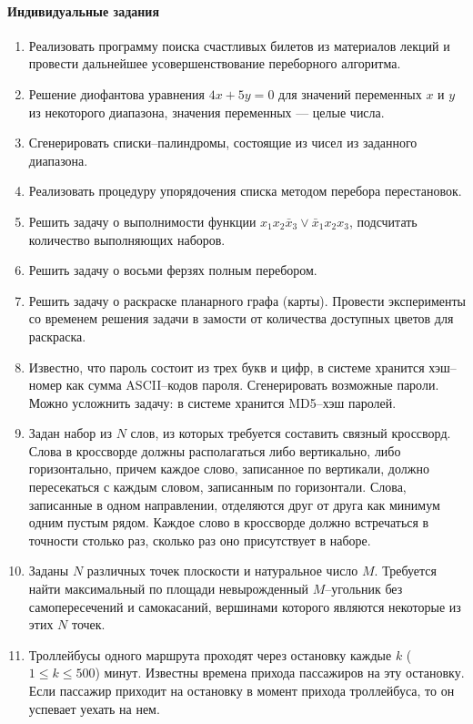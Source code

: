 \documentclass[12pt, openany, twoside]{book} %
\begin{document}
\paragraph{Индивидуальные задания}
\begin{enumerate}
\item Реализовать программу поиска счастливых билетов из материалов лекций и провести дальнейшее усовершенствование переборного алгоритма.
\item Решение диофантова уравнения $4x+5y=0$ для значений переменных $x$ и $y$ из некоторого диапазона, значения переменных --- целые числа.
\item Сгенерировать списки--палиндромы, состоящие из чисел из заданного диапазона.
\item Реализовать процедуру упорядочения списка методом перебора перестановок.
\item Решить задачу о выполнимости функции $x_1x_2\bar{x}_3\vee \bar{x}_1x_2x_3$, подсчитать количество выполняющих наборов.
\item Решить задачу о восьми ферзях полным перебором.
\item Решить задачу о раскраске планарного графа (карты). Провести эксперименты со временем решения задачи в замости от количества доступных цветов для раскраска.
\item Известно, что пароль состоит из трех букв и цифр, в системе хранится хэш--номер как сумма ASCII--кодов пароля. Сгенерировать возможные пароли. Можно усложнить задачу: в системе хранится MD5--хэш паролей.
\item Задан набор из $N$ слов, из которых требуется составить связный кроссворд. Слова в кроссворде должны располагаться либо вертикально, либо горизонтально, причем каждое слово, записанное по вертикали, должно пересекаться с каждым словом, записанным по горизонтали. Слова, записанные в одном направлении, отделяются друг от друга как минимум одним пустым рядом. Каждое слово в кроссворде должно встречаться в точности столько раз, сколько раз оно присутствует в наборе.
\item Заданы $N$ различных точек плоскости и натуральное число $M$. Требуется найти максимальный по площади невырожденный $M$--угольник без самопересечений и самокасаний, вершинами которого являются некоторые из этих $N$ точек.
\item Троллейбусы одного маршрута проходят через остановку
каждые $k$ ($1\leq{}k\leq{}500$) минут. Известны времена прихода пассажиров
на эту остановку. Если пассажир приходит на остановку в
момент прихода троллейбуса, то он успевает уехать на нем.


\end{enumerate}
\end{document}
